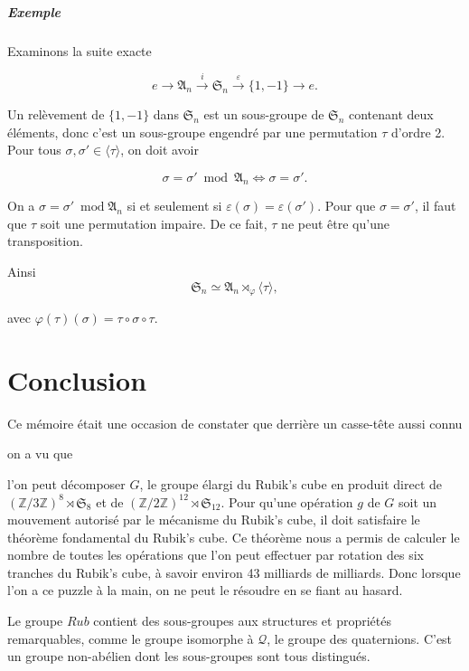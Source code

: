 \documentclass[french]{report}
\begin{document}
\paragraph{Exemple}

Examinons la suite exacte

$$ e \longrightarrow \mathfrak{A}_n \stackrel{i}{\longrightarrow} \mathfrak{S}_n \stackrel{\varepsilon }{\longrightarrow} \{ 1,-1 \} \longrightarrow e.$$

Un relèvement de $\{ 1, -1 \} $ dans $\mathfrak{S}_{n} $ est un sous-groupe de $\mathfrak{S}_n$ contenant deux éléments, donc c'est un sous-groupe engendré par une permutation $\tau$ d'ordre 2. Pour tous $\sigma, \sigma' \in \langle \tau \rangle $, on doit avoir

$$ \sigma = \sigma' \ \operatorname{mod} \ \mathfrak{A}_n \iff \sigma = \sigma'.$$

On a $\sigma = \sigma' \ \operatorname{mod} \mathfrak{A}_n$ si et seulement si $\varepsilon (\sigma) = \varepsilon (\sigma')$. Pour que $\sigma = \sigma'$, il faut que $\tau$ soit une permutation impaire. De ce fait, $\tau$ ne peut être qu'une transposition.

Ainsi $$ \mathfrak{S}_n \simeq \mathfrak{A}_n \rtimes _{\varphi} \langle \tau \rangle,$$

avec $\varphi(\tau)(\sigma) = \tau \circ \sigma \circ \tau$.



\chapter*{Conclusion}

Ce mémoire était une occasion de constater que derrière un casse-tête aussi connu

on a vu que

l'on peut décomposer $G$, le groupe élargi du Rubik's cube en produit direct de  $(\mathbb{Z}/{ 3 }\mathbb{Z})^{8} \rtimes \mathfrak{S}_{8} $ et de $(\mathbb{Z}/{ 2 }\mathbb{Z}) ^{12} \rtimes \mathfrak{S}_{12} $. Pour qu'une opération $g$ de $G$ soit un mouvement autorisé par le mécanisme du Rubik's cube, il doit satisfaire le théorème fondamental du Rubik's cube. Ce théorème nous a permis de calculer le nombre de toutes les opérations que l'on peut effectuer par rotation des six tranches du Rubik's cube, à savoir environ 43 milliards de milliards. Donc lorsque l'on a ce puzzle à la main, on ne peut le résoudre en se fiant au hasard.

Le groupe $Rub$ contient des sous-groupes aux structures et propriétés remarquables, comme le groupe isomorphe à $\mathcal{Q}$, le groupe des quaternions. C'est un groupe non-abélien dont les sous-groupes sont tous distingués.
\end{document}
